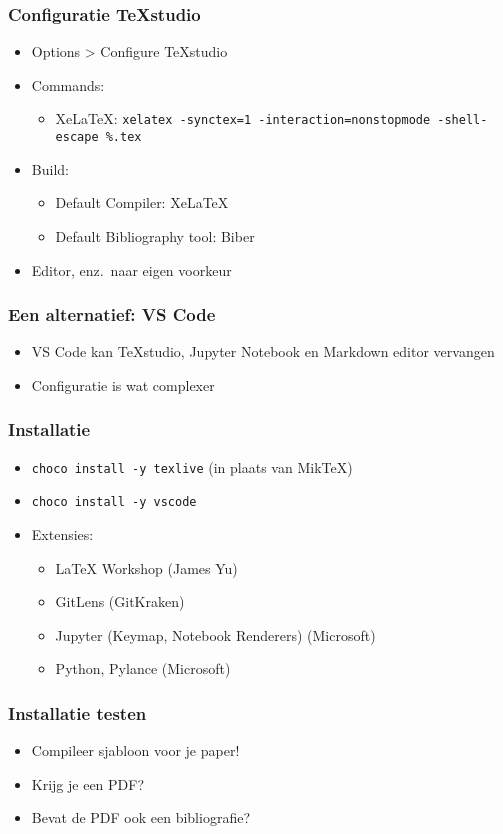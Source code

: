 \documentclass[aspectratio=169]{beamer}
\begin{document}
\begin{frame}
  \frametitle{Configuratie TeXstudio}

  \begin{itemize}
    \item Options > Configure TeXstudio
    \item Commands:
      \begin{itemize}
        \item XeLaTeX\@: \texttt{xelatex -synctex=1 -interaction=nonstopmode -shell-escape \%.tex}
      \end{itemize}
    \item Build:
      \begin{itemize}
        \item Default Compiler: XeLaTeX
        \item Default Bibliography tool: Biber
      \end{itemize}
    \item Editor, enz.\ naar eigen voorkeur
  \end{itemize}

\end{frame}

\begin{frame}
  \frametitle{Een alternatief: VS Code}

  \begin{itemize}
    \item VS Code kan {\TeX}studio, Jupyter Notebook en Markdown editor vervangen
    \item Configuratie is wat complexer
  \end{itemize}

\end{frame}

\begin{frame}
  \frametitle{Installatie}

  \begin{itemize}
    \item \texttt{choco install -y texlive}  (in plaats van Mik{\TeX})
    \item \texttt{choco install -y vscode}
    \item Extensies:
      \begin{itemize}
        \item {\LaTeX} Workshop (James Yu)
        \item GitLens (GitKraken)
        \item Jupyter (Keymap, Notebook Renderers) (Microsoft)
        \item Python, Pylance (Microsoft)
      \end{itemize}
  \end{itemize}

\end{frame}

\begin{frame}
  \frametitle{Installatie testen}

  \begin{itemize}
    \item Compileer sjabloon voor je paper!
    \item Krijg je een PDF?
    \item Bevat de PDF ook een bibliografie?
  \end{itemize}

\end{frame}
\end{document}
